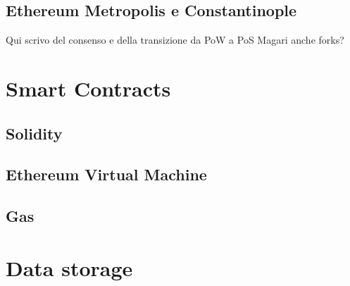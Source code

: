 \subsection{Ethereum Metropolis e Constantinople}

Qui scrivo del consenso e della transizione da PoW a PoS
Magari anche forks?

\section{Smart Contracts}

\subsection{Solidity}

\subsection{Ethereum Virtual Machine}

\subsection{Gas}

\section{Data storage}